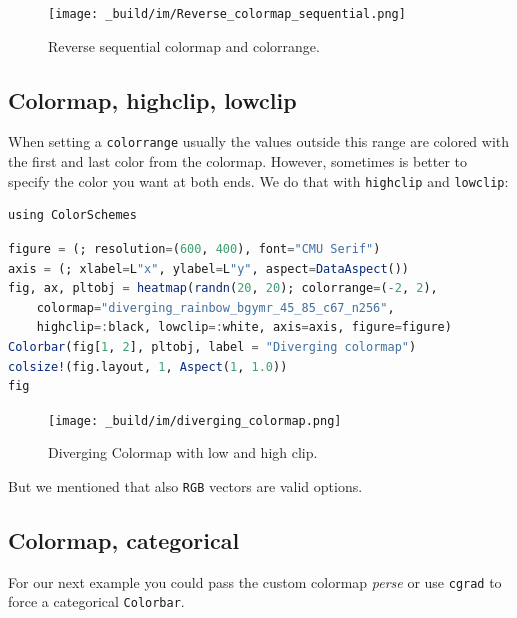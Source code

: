 \documentclass[
  notoc %
]{tufte-book}
\newcommand{\passthrough}[1]{#1}
\begin{document}
\begin{figure}
\hypertarget{fig:Reverse_colormap_sequential}{%
\centering
\texttt{[image: \_build/im/Reverse\_colormap\_sequential.png]}
\caption{Reverse sequential colormap and
colorrange.}\label{fig:Reverse_colormap_sequential}
}
\end{figure}

\hypertarget{colormap-highclip-lowclip}{%
\subsection{Colormap, highclip,
lowclip}\label{colormap-highclip-lowclip}}

When setting a \passthrough{\lstinline!colorrange!} usually the values
outside this range are colored with the first and last color from the
colormap. However, sometimes is better to specify the color you want at
both ends. We do that with \passthrough{\lstinline!highclip!} and
\passthrough{\lstinline!lowclip!}:

\begin{lstlisting}
using ColorSchemes
\end{lstlisting}

\begin{lstlisting}[language=Julia]
figure = (; resolution=(600, 400), font="CMU Serif")
axis = (; xlabel=L"x", ylabel=L"y", aspect=DataAspect())
fig, ax, pltobj = heatmap(randn(20, 20); colorrange=(-2, 2),
    colormap="diverging_rainbow_bgymr_45_85_c67_n256",
    highclip=:black, lowclip=:white, axis=axis, figure=figure)
Colorbar(fig[1, 2], pltobj, label = "Diverging colormap")
colsize!(fig.layout, 1, Aspect(1, 1.0))
fig
\end{lstlisting}

\begin{figure}
\hypertarget{fig:diverging_colormap}{%
\centering
\texttt{[image: \_build/im/diverging\_colormap.png]}
\caption{Diverging Colormap with low and high
clip.}\label{fig:diverging_colormap}
}
\end{figure}

But we mentioned that also \passthrough{\lstinline!RGB!} vectors are
valid options.

\hypertarget{colormap-categorical}{%
\subsection{Colormap, categorical}\label{colormap-categorical}}

For our next example you could pass the custom colormap \emph{perse} or
use \passthrough{\lstinline!cgrad!} to force a categorical
\passthrough{\lstinline!Colorbar!}.
\end{document}
